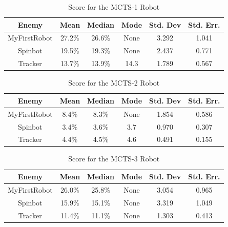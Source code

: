 \begin{table}
\begin{center}
\renewcommand{\arraystretch}{1.3}
\caption{Score for the MCTS-1 Robot}
\label{table-MCTS1-score}
\begin{tabular}{|c | c | c |c | c| c |}
\hline
Enemy & Mean & Median & Mode & Std. Dev & Std. Err.\\
\hline
MyFirstRobot & 27.2\% & 26.6\% & None & 3.292 & 1.041\\
\hline
Spinbot & 19.5\% & 19.3\% & None & 2.437 & 0.771 \\
\hline
Tracker & 13.7\% & 13.9\% & 14.3 & 1.789 & 0.567 \\
\hline
\end{tabular}
\end{center}
\end{table}

\begin{table}
\begin{center}
\renewcommand{\arraystretch}{1.3}
\caption{Score for the MCTS-2 Robot}
\label{table-MCTS2-score}
\begin{tabular}{|c | c | c |c | c| c |}
\hline
Enemy & Mean & Median & Mode & Std. Dev & Std. Err.\\
\hline
MyFirstRobot & 8.4\% & 8.3\% & None & 1.854 & 0.586\\
\hline
Spinbot & 3.4\% & 3.6\% & 3.7 & 0.970 & 0.307  \\
\hline
Tracker & 4.4\% & 4.5\% & 4.6 & 0.491 & 0.155 \\
\hline
\end{tabular}
\end{center}
\end{table}

\begin{table}
\begin{center}
\renewcommand{\arraystretch}{1.3}
\caption{Score for the MCTS-3 Robot}
\label{table-MCTS3-score}
\begin{tabular}{|c | c | c |c | c| c |}
\hline
Enemy & Mean & Median & Mode & Std. Dev & Std. Err.\\
\hline
MyFirstRobot & 26.0\% & 25.8\% & None & 3.054 & 0.965\\
\hline
Spinbot & 15.9\% & 15.1\% & None & 3.319 & 1.049  \\
\hline
Tracker & 11.4\% & 11.1\% & None & 1.303 & 0.413 \\
\hline
\end{tabular}
\end{center}
\end{table}


